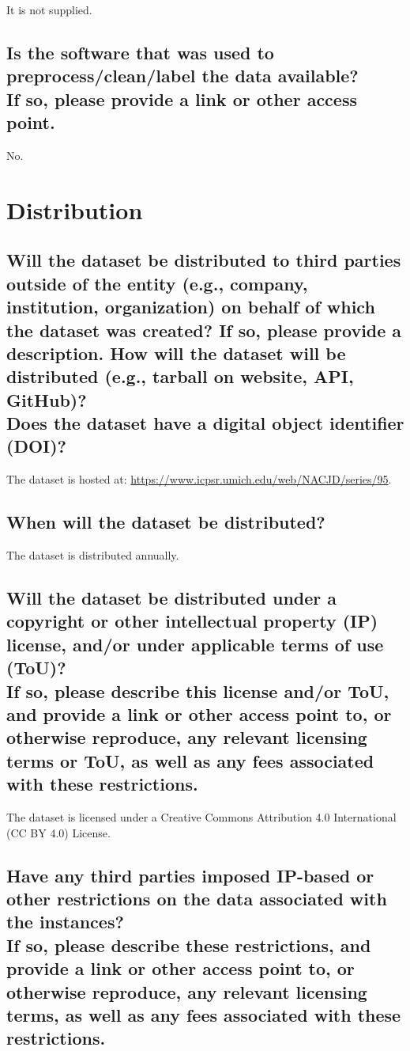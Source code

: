 \documentclass[letterpaper, 10 pt, conference]{ieeeconf}  %
\newcommand{\subtitle}[1]{{\\ \small \normalfont \color{purple} #1}}
\begin{document}
It is not supplied.

\subsection{Is the software that was used to preprocess/clean/label the data available? \subtitle{If so, please provide a link or other access point.}}

No.

\section{Distribution}
\subsection{Will the dataset be distributed to third parties outside of the entity (e.g., company, institution, organization) on behalf of which the dataset was created? If so, please provide a description. How will the dataset will be distributed (e.g., tarball on website, API, GitHub)? \subtitle{Does the dataset have a digital object identifier (DOI)?}}

The dataset is hosted at: \href{https://www.icpsr.umich.edu/web/NACJD/series/95}{https://www.icpsr.umich.edu/web/NACJD/series/95}. 

\subsection{When will the dataset be distributed?}

The dataset is distributed annually.

\subsection{Will the dataset be distributed under a copyright or other intellectual property (IP) license, and/or under applicable terms of use (ToU)? \subtitle{If so, please describe this license and/or ToU, and provide a link or other access point to, or otherwise reproduce, any relevant licensing terms or ToU, as well as any fees associated with these restrictions.}}

The dataset is licensed under a Creative Commons Attribution 4.0 International (CC BY 4.0) License.

\subsection{Have any third parties imposed IP-based or other restrictions on the data associated with the instances? \subtitle{If so, please describe these restrictions, and provide a link or other access point to, or otherwise reproduce, any relevant licensing terms, as well as any fees associated with these restrictions.}}
\end{document}
